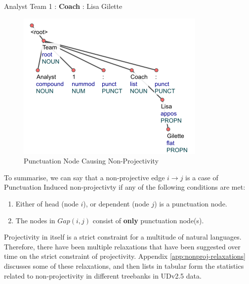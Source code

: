 \begin{example}
Analyst Team 1 : \textbf{Coach} : Lisa Gilette
\end{example}

\begin{figure}[H]
    \centering
    \includegraphics{img/punct-nonproj2.png}
    \caption{Punctuation Node Causing Non-Projectivity}
    \label{fig:punct-nonproj2}
\end{figure}

To summarise, we can say that a non-projective edge \(i \rightarrow j\) is a case of Punctuation Induced non-projectivty if any of the following conditions are met:

\begin{enumerate}
    \item Either of head (node \(i\)), or dependent (node \(j\)) is a punctuation node.
    \item The nodes in \(Gap(i, j)\) consist of \textbf{only} punctuation node(s).
\end{enumerate}

Projectivity in itself is a strict constraint for a multitude of natural languages. Therefore, there have been multiple relaxations that have been suggested over time on the strict constraint of projectivity. Appendix \ref{app:nonproj-relaxations} discusses some of these relaxations, and then lists in tabular form the statistics related to non-projectivity in different treebanks in UDv2.5 data.